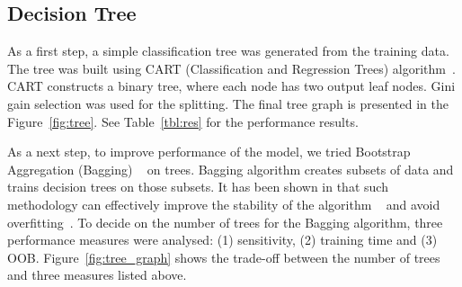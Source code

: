 \subsection{Decision Tree}
\label{sec:tree}

As a first step, a simple classification tree was generated from the 
training data. 
The tree was built using CART (Classification and Regression Trees) 
algorithm~\cite{CART}. 
CART constructs a binary tree, where each node has two output leaf 
nodes. 
Gini gain selection was used for the splitting. The final tree graph 
is presented in the Figure~\ref{fig:tree}.
See Table~\ref{tbl:res} for the performance results.

As a next step, to improve performance of the model, we tried 
Bootstrap Aggregation (Bagging) ~\cite{Bagging} on trees. 
Bagging algorithm creates subsets of data and trains decision trees 
on those subsets. 
It has been shown in that such methodology can 
effectively improve the stability of the algorithm ~\cite{Stability} 
and avoid 
overfitting~\cite{Overfitting}.
To decide on the number of trees for the Bagging algorithm, three 
performance measures were analysed: (1) sensitivity, (2) training 
time and (3) OOB. Figure~\ref{fig:tree_graph} shows the trade-off 
between the number of trees and three measures listed above.


